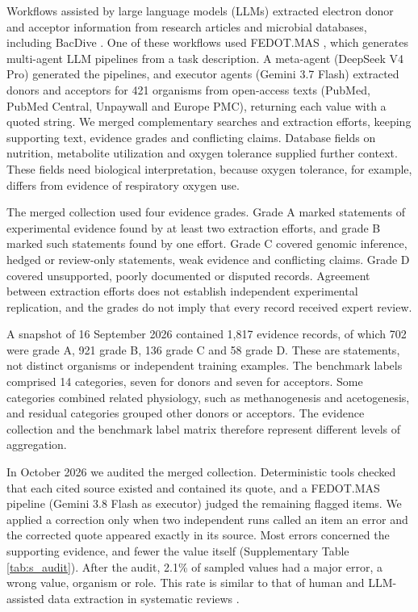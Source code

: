 \documentclass[10pt,a4paper,onecolumn]{article}
\begin{document}
Workflows assisted by large language models (LLMs) extracted electron
donor and acceptor information from research articles and microbial
databases, including BacDive \autocite{Schober2025}. One of these
workflows used FEDOT.MAS \autocite{FedotMAS2026}, which generates
multi-agent LLM pipelines from a task description. A meta-agent
(DeepSeek V4 Pro) generated the pipelines, and executor agents (Gemini
3.7 Flash) extracted donors and acceptors for 421 organisms from
open-access texts (PubMed, PubMed Central, Unpaywall and Europe PMC),
returning each value with a quoted string. We merged complementary
searches and extraction efforts, keeping supporting text, evidence
grades and conflicting claims. Database fields on nutrition, metabolite
utilization and oxygen tolerance supplied further context. These fields
need biological interpretation, because oxygen tolerance, for example,
differs from evidence of respiratory oxygen use.

The merged collection used four evidence grades. Grade A marked
statements of experimental evidence found by at least two extraction
efforts, and grade B marked such statements found by one effort. Grade C
covered genomic inference, hedged or review-only statements, weak
evidence and conflicting claims. Grade D covered unsupported, poorly
documented or disputed records. Agreement between extraction efforts
does not establish independent experimental replication, and the grades
do not imply that every record received expert review.

A snapshot of 16 September 2026 contained 1,817 evidence records, of
which 702 were grade A, 921 grade B, 136 grade C and 58 grade D. These
are statements, not distinct organisms or independent training examples.
The benchmark labels comprised 14 categories, seven for donors and seven
for acceptors. Some categories combined related physiology, such as
methanogenesis and acetogenesis, and residual categories grouped other
donors or acceptors. The evidence collection and the benchmark label
matrix therefore represent different levels of aggregation.

In October 2026 we audited the merged collection. Deterministic tools
checked that each cited source existed and contained its quote, and a
FEDOT.MAS pipeline (Gemini 3.8 Flash as executor) judged the remaining
flagged items. We applied a correction only when two independent runs
called an item an error and the corrected quote appeared exactly in its
source. Most errors concerned the supporting evidence, and fewer the
value itself (Supplementary Table \ref{tab:s_audit}). After the audit,
2.1\% of sampled values had a major error, a wrong value, organism or
role. This rate is similar to that of human and LLM-assisted data
extraction in systematic reviews \autocite{Gartlehner2025}.
\end{document}
